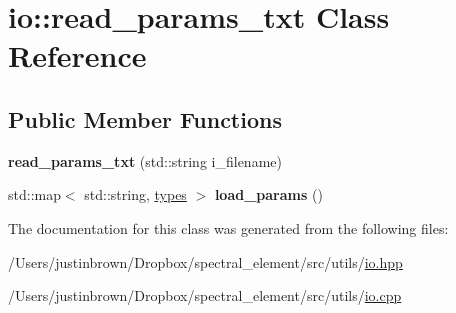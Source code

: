 \hypertarget{classio_1_1read__params__txt}{\section{io\-:\-:read\-\_\-params\-\_\-txt Class Reference}
\label{classio_1_1read__params__txt}
}
\subsection*{Public Member Functions}
\begin{DoxyCompactItemize}
\item 
\hypertarget{classio_1_1read__params__txt_ac958ad053977cb34702e61f4773d0253}{{\bfseries read\-\_\-params\-\_\-txt} (std\-::string i\-\_\-filename)}\label{classio_1_1read__params__txt_ac958ad053977cb34702e61f4773d0253}

\item 
\hypertarget{classio_1_1read__params__txt_aaba489303a35c3def3ba3306c7b7d62f}{std\-::map$<$ std\-::string, \hyperlink{unionio_1_1types}{types} $>$ {\bfseries load\-\_\-params} ()}\label{classio_1_1read__params__txt_aaba489303a35c3def3ba3306c7b7d62f}

\end{DoxyCompactItemize}


The documentation for this class was generated from the following files\-:\begin{DoxyCompactItemize}
\item 
/\-Users/justinbrown/\-Dropbox/spectral\-\_\-element/src/utils/\hyperlink{io_8hpp}{io.\-hpp}\item 
/\-Users/justinbrown/\-Dropbox/spectral\-\_\-element/src/utils/\hyperlink{io_8cpp}{io.\-cpp}\end{DoxyCompactItemize}
